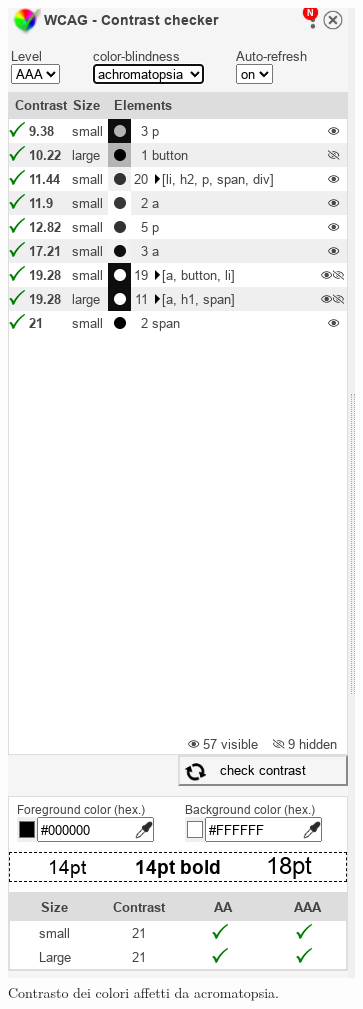 \documentclass{template}
\begin{document}
	\begin{figure}[H]
		\centering
		\includegraphics[scale=0.6]{src/contrasti/achromatopsia.png}
		\caption{Contrasto dei colori affetti da acromatopsia.}
	\end{figure}
	\pagebreak
\end{document}
